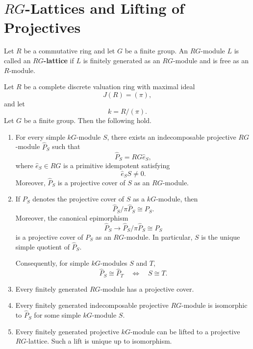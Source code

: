 \section{\texorpdfstring{\(RG\)-Lattices and Lifting of Projectives}{RG-Lattices and Lifting of Projectives}}

\begin{definition}
    Let \(R\) be a commutative ring and let \(G\) be a finite group.
    An \(RG\)-module \(L\) is called an \textbf{\(RG\)-lattice} if
    \(L\) is finitely generated as an \(RG\)-module and is free as an \(R\)-module.
\end{definition}

\begin{proposition}
    Let \(R\) be a complete discrete valuation ring with maximal ideal
    \[
        J(R)=(\pi),
    \]
    and let
    \[
        k=R/(\pi).
    \]
    Let \(G\) be a finite group. Then the following hold.

    \begin{enumerate}
        \item For every simple \(kG\)-module \(S\), there exists an indecomposable
        projective \(RG\)-module \(\widehat P_S\) such that
        \[
            \widehat P_S=RG\widehat e_S,
        \]
        where \(\widehat e_S\in RG\) is a primitive idempotent satisfying
        \[
            \widehat e_S S\neq 0.
        \]
        Moreover, \(\widehat P_S\) is a projective cover of \(S\) as an \(RG\)-module.

        \item If \(P_S\) denotes the projective cover of \(S\) as a \(kG\)-module, then
        \[
            \widehat P_S/\pi\widehat P_S\cong P_S.
        \]
        Moreover, the canonical epimorphism
        \[
            \widehat P_S\longrightarrow \widehat P_S/\pi\widehat P_S\cong P_S
        \]
        is a projective cover of \(P_S\) as an \(RG\)-module. In particular,
        \(S\) is the unique simple quotient of \(\widehat P_S\).

        Consequently, for simple \(kG\)-modules \(S\) and \(T\),
        \[
            \widehat P_S\cong \widehat P_T
            \quad\Longleftrightarrow\quad
            S\cong T.
        \]

        \item Every finitely generated \(RG\)-module has a projective cover.

        \item Every finitely generated indecomposable projective \(RG\)-module is
        isomorphic to \(\widehat P_S\) for some simple \(kG\)-module \(S\).

        \item Every finitely generated projective \(kG\)-module can be lifted to a
        projective \(RG\)-lattice. Such a lift is unique up to isomorphism.
    \end{enumerate}
\end{proposition}

